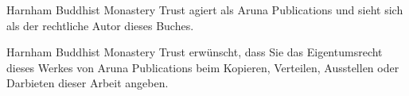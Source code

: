 {Harnham Buddhist Monastery Trust agiert als Aruna Publications und sieht sich als der rechtliche Autor dieses Buches.

Harnham Buddhist Monastery Trust erwünscht, dass Sie das Eigentumsrecht dieses Werkes von Aruna Publications beim Kopieren, Verteilen, Ausstellen oder Darbieten dieser Arbeit angeben.

}
